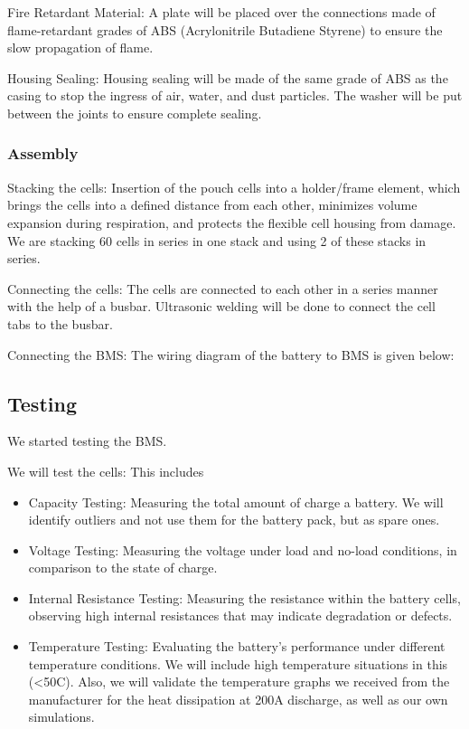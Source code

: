 Fire Retardant Material: A plate will be placed over the connections made of flame-retardant grades of ABS (Acrylonitrile Butadiene Styrene) to ensure the slow propagation of flame.

Housing Sealing: Housing sealing will be made of the same grade of ABS as the casing to stop the ingress of air, water, and dust particles. The washer will be put between the joints to ensure complete sealing.

\subsubsection*{Assembly}
Stacking the cells: Insertion of the pouch cells into a holder/frame element, which brings the cells into a defined distance from each other, minimizes volume expansion during respiration, and protects the flexible cell housing from damage. We are stacking 60 cells in series in one stack and using 2 of these stacks in series.

Connecting the cells: The cells are connected to each other in a series manner with the help of a busbar. Ultrasonic welding will be done to connect the cell tabs to the busbar.

Connecting the BMS: The wiring diagram of the battery to BMS is given below:



\subsection{Testing}
We started testing the BMS.

We will test the cells: This includes 
\begin{itemize}
    \item Capacity Testing: Measuring the total amount of charge a battery. We will identify outliers and not use them for the battery pack, but as spare ones.
    \item Voltage Testing: Measuring the voltage under load and no-load conditions, in comparison to the state of charge.
    \item Internal Resistance Testing: 
    Measuring the resistance within the battery cells, observing high internal resistances that may indicate degradation or defects.
    \item Temperature Testing: Evaluating the battery's performance under different temperature conditions. We will include high temperature situations in this (<50C). Also, we will validate the temperature graphs we received from the manufacturer for the heat dissipation at 200A discharge, as well as our own simulations.
\end{itemize}

